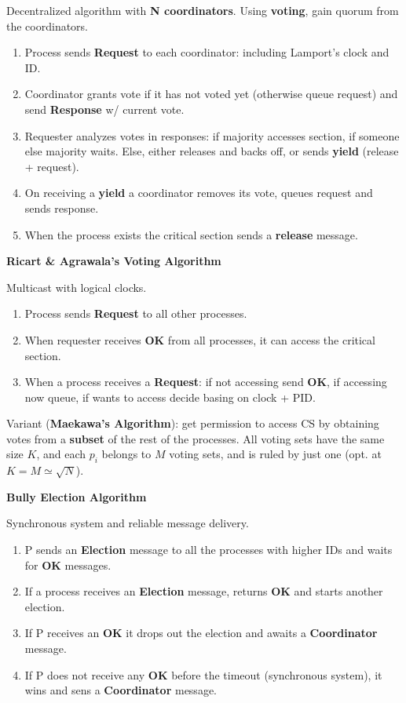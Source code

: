 \documentclass[a4paper, 10pt, twocolumn]{article}
\begin{document}
    Decentralized algorithm with \textbf{N coordinators}.
    Using \textbf{voting}, gain quorum from the coordinators.
    \begin{enumerate}
        \item Process sends \textbf{Request} to each coordinator: including Lamport's clock and ID.
        \item Coordinator grants vote if it has not voted yet (otherwise queue request) and send \textbf{Response} w/ current vote.
        \item Requester analyzes votes in responses: if majority accesses section, if someone else majority waits. Else, either releases and backs off, or sends \textbf{yield} (release + request).
        \item On receiving a \textbf{yield} a coordinator removes its vote, queues request and sends response.
        \item When the process exists the critical section sends a \textbf{release} message.
    \end{enumerate}

    \textbf{Ricart \& Agrawala's Voting Algorithm}

    Multicast with logical clocks.
    \begin{enumerate}
        \item Process sends \textbf{Request} to all other processes.
        \item When requester receives \textbf{OK} from all processes, it can access the critical section.
        \item When a process receives a \textbf{Request}: if not accessing send \textbf{OK}, if accessing now queue, if wants to access decide basing on clock + PID.
    \end{enumerate}
    Variant (\textbf{Maekawa's Algorithm}): get permission to access CS by obtaining votes from a \textbf{subset} of the rest of the processes.
    All voting sets have the same size $K$, and each $p_i$ belongs to $M$ voting sets, and is ruled by just one (opt. at $K = M \simeq \sqrt{N}$).

    \textbf{Bully Election Algorithm}

    Synchronous system and reliable message delivery.
    \begin{enumerate}
        \item P sends an \textbf{Election} message to all the processes with higher IDs and waits for \textbf{OK} messages.
        \item If a process receives an \textbf{Election} message, returns \textbf{OK} and starts another election.
        \item If P receives an \textbf{OK} it drops out the election and awaits a \textbf{Coordinator} message.
        \item If P does not receive any \textbf{OK} before the timeout (synchronous system), it wins and sens a \textbf{Coordinator} message.
    \end{enumerate}
\end{document}

